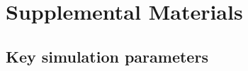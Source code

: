 \documentclass[letterpaper]{article}
\begin{document}






\appendix
\onecolumn
\section{Supplemental Materials}
\setcounter{page}{0}

\subsection{Key simulation parameters}
\end{document}

